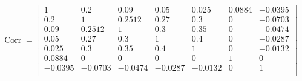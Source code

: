 \documentclass[11pt]{article}
\begin{document}
\begin{appendices}
\[
\operatorname{Corr} =
\begin{bmatrix}
1 & 0.2 & 0.09 & 0.05 & 0.025 & 0.0884 & -0.0395 \\
0.2 & 1 & 0.2512 & 0.27 & 0.3 & 0 & -0.0703 \\
0.09 & 0.2512 & 1 & 0.3 & 0.35 & 0 & -0.0474 \\
0.05 & 0.27 & 0.3 & 1 & 0.4 & 0 & -0.0287 \\
0.025 & 0.3 & 0.35 & 0.4 & 1 & 0 & -0.0132 \\
0.0884 & 0 & 0 & 0 & 0 & 1 & 0 \\
-0.0395 & -0.0703 & -0.0474 & -0.0287 & -0.0132 & 0 & 1 \\
\end{bmatrix}
\]

\end{appendices}
\ifdefined\COMPILINGMAIN
\else
\end{document}
